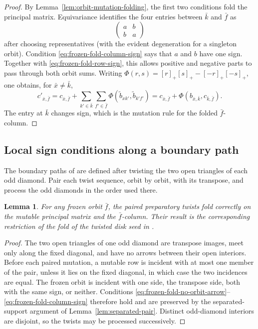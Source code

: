 \documentclass[11pt]{amsart}
\newtheorem{lemma}[theorem]{Lemma}
\theoremstyle{definition}
\theoremstyle{remark}
\begin{document}
\begin{proof}
By Lemma~\ref{lem:orbit-mutation-folding}, the first two conditions fold
the principal matrix.  Equivariance identifies the four entries between
$\bar k$ and $\bar f$ as
\[ \begin{pmatrix}a&b\\ b&a\end{pmatrix} \]
after choosing representatives (with the evident degeneration for a
singleton orbit).  Condition \eqref{eq:frozen-fold-column-sign} says that
$a$ and $b$ have one sign.  Together with
\eqref{eq:frozen-fold-row-sign}, this allows positive and negative parts to
pass through both orbit sums.  Writing
\(
 \Phi(r,s)=[r]_+[s]_+-[-r]_+[-s]_+
\), one obtains, for $\bar x\ne\bar k$,
\[ c'_{\bar x,\bar f} =c_{\bar x,\bar f} +\sum_{k'\in\bar k}\sum_{f'\in\bar f} \Phi(\widetilde b_{xk'},\widetilde b_{k'f'}) =c_{\bar x,\bar f} +\Phi(b_{\bar x,\bar k},c_{\bar k,\bar f}). \]
The entry at $\bar k$ changes sign, which is the mutation rule for the
folded $\bar f$-column.
\end{proof}

\subsection{Local sign conditions along a boundary path}

The boundary paths of \cite{FeiKroneckerII} are defined after twisting the
two open triangles of each odd diamond.  Pair each twist sequence, orbit by
orbit, with its transpose, and process the odd diamonds in the order used
there.

\begin{lemma}\label{lem:folded-preparatory-twists}
For any frozen orbit $\bar f$, the paired preparatory twists fold
correctly on the mutable principal matrix and the $\bar f$-column.  Their
result is the corresponding restriction of the fold of the twisted disk
seed in \cite{FeiKroneckerII}.
\end{lemma}

\begin{proof}
The two open triangles of one odd diamond are transpose images, meet only
along the fixed diagonal, and have no arrows between their open interiors.
Before each paired mutation, a mutable row is incident with at most one
member of the pair, unless it lies on the fixed diagonal, in which case the
two incidences are equal.  The frozen orbit is incident with one side, the
transpose side, both with the same sign, or neither.  Conditions
\eqref{eq:frozen-fold-no-orbit-arrow}--
\eqref{eq:frozen-fold-column-sign} therefore hold and are preserved by the
separated-support argument of Lemma~\ref{lem:separated-pair}.  Distinct
odd-diamond interiors are disjoint, so the twists may be processed
successively.
\end{proof}
\end{document}
